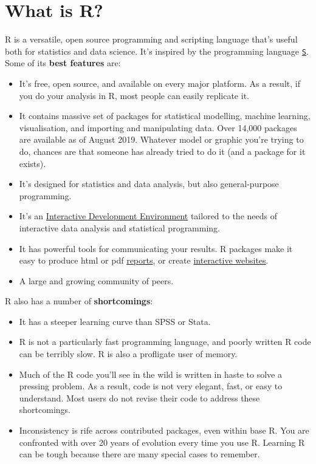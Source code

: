 \documentclass[]{book}
\begin{document}
\hypertarget{what-is-r}{\section{What is R?}\label{what-is-r}}

R is a versatile, open source programming and scripting language that's
useful both for statistics and data science. It's inspired by the
programming language
\href{https://en.wikipedia.org/wiki/S_(programming_language)}{\texttt{S}}.
Some of its \textbf{best features} are:

\begin{itemize}
\item
  It's free, open source, and available on every major platform. As a
  result, if you do your analysis in R, most people can easily replicate
  it.
\item
  It contains massive set of packages for statistical modelling, machine
  learning, visualisation, and importing and manipulating data. Over
  14,000 packages are available as of August 2019. Whatever model or
  graphic you're trying to do, chances are that someone has already
  tried to do it (and a package for it exists).
\item
  It's designed for statistics and data analysis, but also
  general-purpose programming.
\item
  It's an \href{http://www.rstudio.com/ide/}{Interactive Development
  Environment} tailored to the needs of interactive data analysis and
  statistical programming.
\item
  It has powerful tools for communicating your results. R packages make
  it easy to produce html or pdf
  \href{http://yihui.name/knitr/}{reports}, or create
  \href{http://www.rstudio.com/shiny/}{interactive websites}.
\item
  A large and growing community of peers.
\end{itemize}

R also has a number of \textbf{shortcomings}:

\begin{itemize}
\item
  It has a steeper learning curve than SPSS or Stata.
\item
  R is not a particularly fast programming language, and poorly written
  R code can be terribly slow. R is also a profligate user of memory.
\item
  Much of the R code you'll see in the wild is written in haste to solve
  a pressing problem. As a result, code is not very elegant, fast, or
  easy to understand. Most users do not revise their code to address
  these shortcomings.
\item
  Inconsistency is rife across contributed packages, even within base R.
  You are confronted with over 20 years of evolution every time you use
  R. Learning R can be tough because there are many special cases to
  remember.
\end{itemize}
\end{document}
